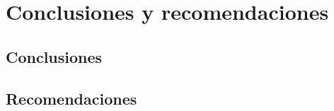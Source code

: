 \documentclass[0000.tex]{subfiles}
\begin{document}

\chapter{Conclusiones y recomendaciones}\label{ch:conclusions}
\section{Conclusiones}

\section{Recomendaciones}

\ifSubfilesClassLoaded{}{}
\end{document}
